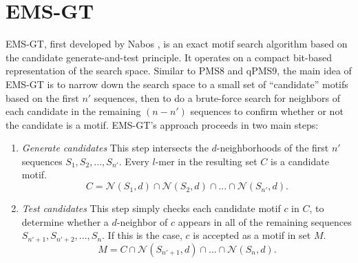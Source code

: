 \documentclass[oneside,12pt]{DISCSthesis}
\begin{document}
	\newpage
	\section{EMS-GT}
		EMS-GT, first developed by Nabos \cite{nabos2015dissertation}, is an exact motif search algorithm based on the candidate generate-and-test principle.
		It operates on a compact bit-based representation of the search space.
		Similar to PMS8 and qPMS9, the main idea of EMS-GT is to narrow down the search space to a small set of ``candidate'' motifs based on the first $n'$ sequences, then to do a brute-force search for neighbors of each candidate in the remaining $(n - n')$ sequences to confirm whether or not the candidate is a motif.
		EMS-GT's approach proceeds in two main steps:
		\begin{enumerate} %
			\item {\em Generate candidates}\newline
			This step intersects the $d$-neighborhoods of the first $n'$ sequences $S_{1},S_{2},...,S_{n'}$. Every $l$-mer in the resulting set $C$ is a candidate motif.
				\begin{equation} C = \mathcal{N}(S_{1}, d) \cap \mathcal{N}(S_{2}, d) \cap...\cap \mathcal{N}(S_{n'}, d). \end{equation}
			\item {\em Test candidates}\newline
			This step simply checks each candidate motif $c$ in $C$, to determine whether a $d$-neighbor of $c$ appears in all of the remaining sequences $S_{n'+1},S_{n'+2},...,S_{n}$. If this is the case, $c$ is accepted as a motif in set $M$.
				\begin{equation} M = C \cap \mathcal{N}(S_{n'+1}, d) \cap...\cap \mathcal{N}(S_{n}, d). \end{equation}
			\end{enumerate}
\end{document}
